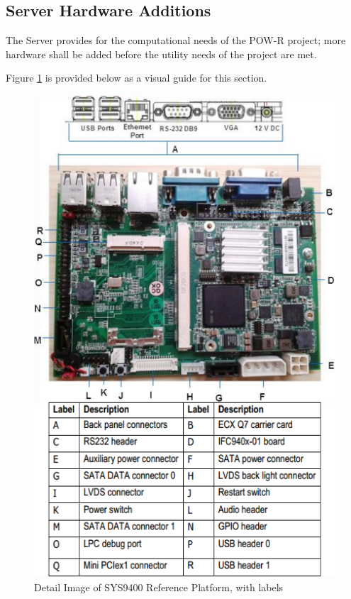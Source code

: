 
\subsection{Server Hardware Additions}

The Server provides for the computational needs of the \ac{POW-R} project; 
more hardware shall be added before the utility needs of the project are met. 

Figure \ref{SYS9400} is provided below as a visual guide for this section.

\begin{figure}
\centering
\includegraphics[scale=1]{Hardware/images/SYS9400-detail.png}
\caption{Detail Image of SYS9400 Reference Platform, with labels}
\label{SYS9400}
\end{figure}



